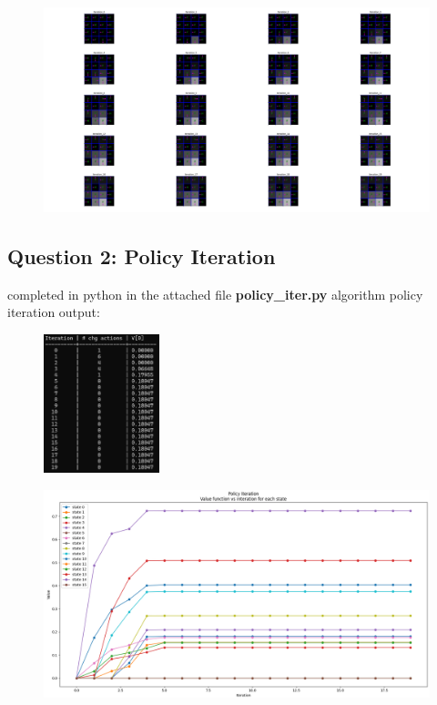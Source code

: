 \documentclass{assignmeownt}
\begin{document}
\begin{figure}[H]
    \centering
    \includegraphics[width=1.0\textwidth]{q2_1_optimal_policy_per_iter_plot.png}
\end{figure}

\subsection{Question 2: Policy Iteration}
completed in python in the attached file \textbf{policy\_iter.py}
\newline
algorithm policy iteration output:
\begin{figure}[H]
    \centering
    \includegraphics[width=0.3\textwidth]{q2_2_iter_table_print.png}
\end{figure}

\begin{figure}[H]
    \centering
    \includegraphics[width=1.0\textwidth]{q2_2_state_value_per_iter_plot.png}
\end{figure}
\end{document}
